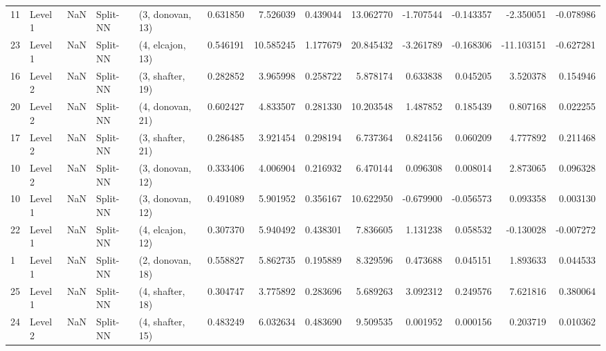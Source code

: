 \begin{tabular}{llrllrrrrrrrr}
11 &   Level 1 &    NaN &       Split-NN &  (3, donovan, 13) &   0.631850 &   7.526039 &  0.439044 &  13.062770 &            -1.707544 &              -0.143357 &           -2.350051 &             -0.078986 \\
23 &   Level 1 &    NaN &       Split-NN &  (4, elcajon, 13) &   0.546191 &  10.585245 &  1.177679 &  20.845432 &            -3.261789 &              -0.168306 &          -11.103151 &             -0.627281 \\
16 &   Level 2 &    NaN &       Split-NN &  (3, shafter, 19) &   0.282852 &   3.965998 &  0.258722 &   5.878174 &             0.633838 &               0.045205 &            3.520378 &              0.154946 \\
20 &   Level 2 &    NaN &       Split-NN &  (4, donovan, 21) &   0.602427 &   4.833507 &  0.281330 &  10.203548 &             1.487852 &               0.185439 &            0.807168 &              0.022255 \\
17 &   Level 2 &    NaN &       Split-NN &  (3, shafter, 21) &   0.286485 &   3.921454 &  0.298194 &   6.737364 &             0.824156 &               0.060209 &            4.777892 &              0.211468 \\
10 &   Level 2 &    NaN &       Split-NN &  (3, donovan, 12) &   0.333406 &   4.006904 &  0.216932 &   6.470144 &             0.096308 &               0.008014 &            2.873065 &              0.096328 \\
10 &   Level 1 &    NaN &       Split-NN &  (3, donovan, 12) &   0.491089 &   5.901952 &  0.356167 &  10.622950 &            -0.679900 &              -0.056573 &            0.093358 &              0.003130 \\
22 &   Level 1 &    NaN &       Split-NN &  (4, elcajon, 12) &   0.307370 &   5.940492 &  0.438301 &   7.836605 &             1.131238 &               0.058532 &           -0.130028 &             -0.007272 \\
1  &   Level 1 &    NaN &       Split-NN &  (2, donovan, 18) &   0.558827 &   5.862735 &  0.195889 &   8.329596 &             0.473688 &               0.045151 &            1.893633 &              0.044533 \\
25 &   Level 1 &    NaN &       Split-NN &  (4, shafter, 18) &   0.304747 &   3.775892 &  0.283696 &   5.689263 &             3.092312 &               0.249576 &            7.621816 &              0.380064 \\
24 &   Level 2 &    NaN &       Split-NN &  (4, shafter, 15) &   0.483249 &   6.032634 &  0.483690 &   9.509535 &             0.001952 &               0.000156 &            0.203719 &              0.010362 \\

\end{tabular}
